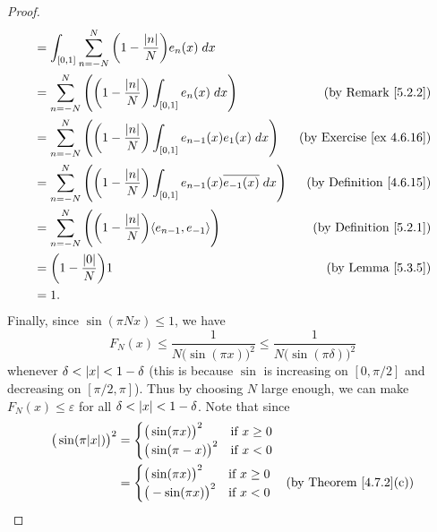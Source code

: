 \begin{proof}
\begin{align*}
         & = \int_{[0, 1]} \sum_{n = -N}^N \bigg(1 - \frac{\abs*{n}}{N}\bigg) e_n(x) \; dx                                                                               \\
         & = \sum_{n = -N}^N \Bigg(\bigg(1 - \frac{\abs*{n}}{N}\bigg) \int_{[0, 1]} e_n(x) \; dx\Bigg)                            & \text{(by Remark \ref{5.2.2})}       \\
         & = \sum_{n = -N}^N \Bigg(\bigg(1 - \frac{\abs*{n}}{N}\bigg) \int_{[0, 1]} e_{n - 1}(x) e_1(x) \; dx\Bigg)               & \text{(by Exercise \ref{ex 4.6.16})} \\
         & = \sum_{n = -N}^N \Bigg(\bigg(1 - \frac{\abs*{n}}{N}\bigg) \int_{[0, 1]} e_{n - 1}(x) \overline{e_{-1}(x)} \; dx\Bigg) & \text{(by Definition \ref{4.6.15})}  \\
         & = \sum_{n = -N}^N \Bigg(\bigg(1 - \frac{\abs*{n}}{N}\bigg) \inner*{e_{n - 1}, e_{-1}}\Bigg)                            & \text{(by Definition \ref{5.2.1})}   \\
         & = \bigg(1 - \frac{\abs*{0}}{N}\bigg) 1                                                                                 & \text{(by Lemma \ref{5.3.5})}        \\
         & = 1.
    \end{align*}
    Finally, since \(\sin(\pi N x) \leq 1\), we have
    \[
        F_N(x) \leq \frac{1}{N \big(\sin(\pi x)\big)^2} \leq \frac{1}{N \big(\sin(\pi \delta)\big)^2}
    \]
    whenever \(\delta < \abs*{x} < 1 - \delta\)
    (this is because \(\sin\) is increasing on \([0, \pi / 2]\) and decreasing on \([\pi / 2, \pi]\)).
    Thus by choosing \(N\) large enough, we can make \(F_N (x) \leq \varepsilon\) for all \(\delta < \abs*{x} < 1 - \delta\).
    Note that since
    \begin{align*}
        \big(\sin(\pi \abs*{x})\big)^2 & = \begin{cases}
            \big(\sin(\pi x)\big)^2  & \text{if } x \geq 0 \\
            \big(\sin(\pi -x)\big)^2 & \text{if } x < 0
        \end{cases}                                      \\
                                       & = \begin{cases}
            \big(\sin(\pi x)\big)^2  & \text{if } x \geq 0 \\
            \big(-\sin(\pi x)\big)^2 & \text{if } x < 0
        \end{cases} & \text{(by Theorem \ref{4.7.2}(c))} \\

\end{align*}
\end{proof}

